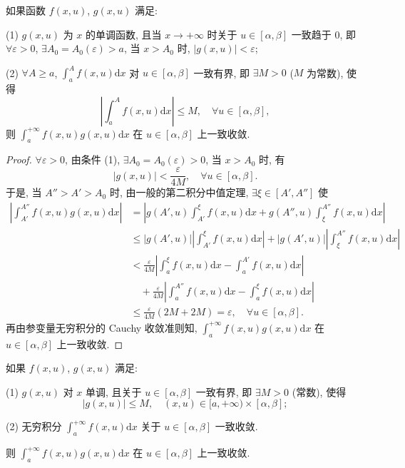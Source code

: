 \begin{theorem}\label{thm:15.2.4}
如果函数 $f(x,u)$, $g(x,u)$ 满足:

(1) $g(x,u)$ 为 $x$ 的单调函数, 且当 $x\to+\infty$ 时关于 $u\in[\alpha,\beta]$ 一致趋于 $0$, 即 $\forall\varepsilon>0$, $\exists A_{0}=A_{0}(\varepsilon)>a$, 当 $x>A_{0}$ 时, $|g(x,u)|<\varepsilon$;

(2) $\forall A\geqslant a$, $\displaystyle\int_{a}^{A}f(x,u)\mathrm{d}x$ 对 $u\in[\alpha,\beta]$ 一致有界, 即 $\exists M>0$ ($M$ 为常数), 使得
\[
  \left|\int_{a}^{A}f(x,u)\mathrm{d}x\right|\leqslant M,\quad\forall u\in[\alpha,\beta],
\]
则 $\displaystyle\int_{a}^{+\infty}f(x,u)g(x,u)\mathrm{d}x$ 在 $u\in[\alpha,\beta]$ 上一致收敛.
\end{theorem}

\begin{proof}
$\forall\varepsilon>0$, 由条件 (1), $\exists A_{0}=A_{0}(\varepsilon)>0$, 当 $x>A_{0}$ 时, 有
\[
  |g(x,u)|<\frac{\varepsilon}{4M},\quad\forall u\in[\alpha,\beta].
\]
于是, 当 $A''>A'>A_{0}$ 时, 由一般的第二积分中值定理, $\exists\xi\in[A',A'']$ 使
\[
  \begin{aligned}
    \left|\int_{A'}^{A''}f(x,u)g(x,u)\mathrm{d}x\right|
    &=\left|g(A',u)\int_{A'}^{\xi}f(x,u)\mathrm{d}x+g(A'',u)\int_{\xi}^{A''}f(x,u)\mathrm{d}x\right|\\
    &\leqslant|g(A',u)|\left|\int_{A'}^{\xi}f(x,u)\mathrm{d}x\right|+|g(A',u)|\left|\int_{\xi}^{A''}f(x,u)\mathrm{d}x\right|\\
    &<\frac{\varepsilon}{4M}\left|\int_{a}^{\xi}f(x,u)\mathrm{d}x-\int_{a}^{A'}f(x,u)\mathrm{d}x\right|\\
    &\quad+\frac{\varepsilon}{4M}\left|\int_{a}^{A''}f(x,u)\mathrm{d}x-\int_{a}^{\xi}f(x,u)\mathrm{d}x\right|\\
    &\leqslant\frac{\varepsilon}{4M}(2M+2M)=\varepsilon,\quad\forall u\in[\alpha,\beta].
  \end{aligned}
\]
再由参变量无穷积分的 Cauchy 收敛准则知, $\displaystyle\int_{a}^{+\infty}f(x,u)g(x,u)\mathrm{d}x$ 在 $u\in[\alpha,\beta]$ 上一致收敛.
\end{proof}

\begin{theorem}\label{thm:15.2.5}
如果 $f(x,u)$, $g(x,u)$ 满足:

(1) $g(x,u)$ 对 $x$ 单调, 且关于 $u\in[\alpha,\beta]$ 一致有界, 即 $\exists M>0$ (常数), 使得
\[
  |g(x,u)|\leqslant M,\quad(x,u)\in[a,+\infty)\times[\alpha,\beta];
\]

(2) 无穷积分 $\displaystyle\int_{a}^{+\infty}f(x,u)\mathrm{d}x$ 关于 $u\in[\alpha,\beta]$ 一致收敛.

则 $\displaystyle\int_{a}^{+\infty}f(x,u)g(x,u)\mathrm{d}x$ 在 $u\in[\alpha,\beta]$ 上一致收敛.
\end{theorem}

